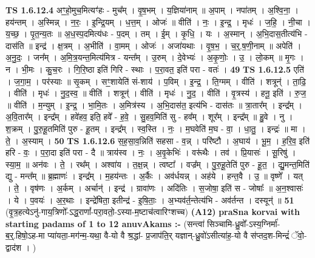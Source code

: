 \documentclass[17pt]{extarticle}
\begin{document}
                  \newline
                                \textbf{ TS 1.6.12.4} \newline
                  अꣳ॒॒हो॒मुच॒मित्यꣳ॑हः - मुच᳚म् । वृ॒ष॒भम् । य॒ज्ञिया॑नाम् ॥ अ॒पाम् । नपा॑तम् । अ॒श्वि॒ना॒ । हय॑न्तम् । अ॒स्मिन्न् । न॒रः॒ । इ॒न्द्रि॒यम् । ध॒त्त॒म् । ओजः॑ ॥ वीति॑ । नः॒ । इ॒न्द्र॒ । मृधः॑ । ज॒हि॒ । नी॒चा । य॒च्छ॒ । पृ॒त॒न्य॒तः ॥ अ॒ध॒स्प॒दमित्य॑धः - प॒दम् । तम् । ई॒म् । कृ॒धि॒ । यः । अ॒स्मान् । अ॒भि॒दास॒तीत्य॑भि - दास॑ति ॥ इन्द्र॑ । क्ष॒त्रम् । अ॒भीति॑ । वा॒मम् । ओजः॑ । अजा॑यथाः । वृ॒ष॒भ॒ । च॒र्॒.ष॒णी॒नाम् ॥ अपेति॑ । अ॒नु॒दः॒ । जन᳚म् । अ॒मि॒त्र॒यन्त॒मित्य॑मित्र - यन्त᳚म् । उ॒रुम् । दे॒वेभ्यः॑ । अ॒कृ॒णोः॒ । उ॒ । लो॒कम् ॥ मृ॒गः । न । भी॒मः । कु॒च॒रः । गि॒रि॒ष्ठा इति॑ गिरि - स्थाः । प॒रा॒वत॒ इति॑ परा - वतः॑ । \textbf{  49} \newline
                  \newline
                                \textbf{ TS 1.6.12.5} \newline
                  एति॑ । ज॒गा॒म॒ । पर॑स्याः ॥ सृ॒कम् । सꣳ॒॒शायेति॑ सं-शाय॑ । प॒विम् । इ॒न्द्र॒ । ति॒ग्मम् । वीति॑ । शत्रून्॑ । ता॒ढि॒ । वीति॑ । मृधः॑ । नु॒द॒स्व॒ ॥ वीति॑ । शत्रून्॑ । वीति॑ । मृधः॑ । नु॒द॒ । वीति॑ । वृ॒त्रस्य॑ । हनू॒ इति॑ । रु॒ज॒ ॥ वीति॑ । म॒न्युम् । इ॒न्द्र॒ । भा॒मि॒तः । अ॒मित्र॑स्य । अ॒भि॒दास॑त॒ इत्य॑भि - दास॑तः ॥ त्रा॒तार᳚म् । इन्द्र᳚म् । अ॒वि॒तार᳚म् । इन्द्र᳚म् । हवे॑हव॒ इति॒ हवे᳚ - ह॒वे॒ । सु॒हव॒मिति॑ सु - हव᳚म् । शूर᳚म् । इन्द्र᳚म् ॥ हु॒वे । नु । श॒क्रम् । पु॒रु॒हू॒तमिति॑ पुरु - हू॒तम् । इन्द्र᳚म् । स्व॒स्ति । नः॒ । म॒घवेति॑ म॒घ - वा॒ । धा॒तु॒ । इन्द्रः॑ ॥ मा । ते॒ । अ॒स्याम् । \textbf{  50} \newline
                  \newline
                                \textbf{ TS 1.6.12.6} \newline
                  स॒ह॒सा॒व॒न्निति॑ सहसा - व॒न्न् । परि॑ष्टौ । अ॒घाय॑ । भू॒म॒ । ह॒रि॒व॒ इति॑ हरि - वः॒ । प॒रा॒दा इति॑ परा - दै ॥ त्राय॑स्व । नः॒ । अ॒वृ॒केभिः॑ । वरू॑थैः । तव॑ । प्रि॒यासः॑ । सू॒रिषु॑ । स्या॒म॒ ॥ अन॑वः । ते॒ । रथ᳚म् । अश्वा॑य । त॒क्ष॒न्न् । त्वष्टा᳚ । वज्र᳚म् । पु॒रु॒हू॒तेति॑ पुरु - हू॒त॒ । द्यु॒मन्त॒मिति॑ द्यु - मन्त᳚म् ॥ ब्र॒ह्माणः॑ । इन्द्र᳚म् । म॒हय॑न्तः । अ॒र्कैः । अव॑र्धयन्न् । अह॑ये । हन्त॒वै । उ॒ ॥ वृष्णे᳚ । यत् । ते॒ । वृष॑णः । अ॒र्कम् । अर्चान्॑ । इन्द्र॑ । ग्रावा॑णः । अदि॑तिः । स॒जोषा॒ इति॑ स - जोषाः᳚ ॥ अ॒न॒श्वासः॑ । ये । प॒वयः॑ । अ॒र॒थाः । इन्द्रे॑षिता॒ इतीन्द्र॑ - इ॒षि॒ताः॒ । अ॒भ्यव॑र्त॒न्तेत्य॑भि - अव॑र्तन्त । दस्यून्॑ ॥ \textbf{  51} \newline
                  \newline
                      (वृ॒त्र॒हत्येऽनु॑-गाय॒त्रिणो᳚-ऽद्ध॒राणां᳚-परा॒वतो॒-ऽस्या-म॒ष्टाच॑त्वारिꣳशच्च)  \textbf{(A12)} \newline \newline
\textbf{praSna korvai with starting padams of 1 to 12 anuvAkams :-} \newline
(सन्त्वा॑ सिञ्चामि-ध्रु॒वो᳚-ऽस्य॒ग्निर्मा॑-ब॒र्॒.हिषो॒ऽह-मा प्या॑यता॒-मग॑न्म॒-यथा॒ वै-यो वै श्र॒द्धां- प्र॒जाप॑ति॒र् यज्ञान्-ध्रु॒वो॑ऽसीत्या॑ह॒-यो वै स॑प्तद॒श-मिन्द्रं॑ ॅवो॒-द्वाद॑श । ) \newline
\end{document}
